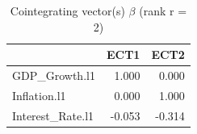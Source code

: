 \begin{table}

\caption{\label{tab:vecm-loadings}Cointegrating vector(s) $\beta$  (rank r = 2)}
\centering
\begin{tabular}[t]{lrr}
\toprule
  & ECT1 & ECT2\\
\midrule
GDP\_Growth.l1 & 1.000 & 0.000\\
Inflation.l1 & 0.000 & 1.000\\
Interest\_Rate.l1 & -0.053 & -0.314\\
\bottomrule
\end{tabular}
\end{table}
